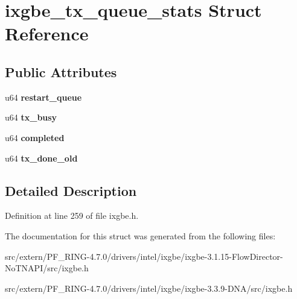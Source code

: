 \hypertarget{structixgbe__tx__queue__stats}{
\section{ixgbe\_\-tx\_\-queue\_\-stats Struct Reference}
\label{structixgbe__tx__queue__stats}
}
\subsection*{Public Attributes}
\begin{DoxyCompactItemize}
\item 
\hypertarget{structixgbe__tx__queue__stats_a6b5b4dfe2dcf07fc28d8f4a99413fb33}{
u64 {\bfseries restart\_\-queue}}
\label{structixgbe__tx__queue__stats_a6b5b4dfe2dcf07fc28d8f4a99413fb33}

\item 
\hypertarget{structixgbe__tx__queue__stats_aeb684ad4734bb1cc1ec413e96d2f5338}{
u64 {\bfseries tx\_\-busy}}
\label{structixgbe__tx__queue__stats_aeb684ad4734bb1cc1ec413e96d2f5338}

\item 
\hypertarget{structixgbe__tx__queue__stats_a27a76b4224e22091c3f88fc24785cecd}{
u64 {\bfseries completed}}
\label{structixgbe__tx__queue__stats_a27a76b4224e22091c3f88fc24785cecd}

\item 
\hypertarget{structixgbe__tx__queue__stats_a6d4f89d5c17a8716e3b6df373ea4b77e}{
u64 {\bfseries tx\_\-done\_\-old}}
\label{structixgbe__tx__queue__stats_a6d4f89d5c17a8716e3b6df373ea4b77e}

\end{DoxyCompactItemize}


\subsection{Detailed Description}


Definition at line 259 of file ixgbe.h.



The documentation for this struct was generated from the following files:\begin{DoxyCompactItemize}
\item 
src/extern/PF\_\-RING-\/4.7.0/drivers/intel/ixgbe/ixgbe-\/3.1.15-\/FlowDirector-\/NoTNAPI/src/ixgbe.h\item 
src/extern/PF\_\-RING-\/4.7.0/drivers/intel/ixgbe/ixgbe-\/3.3.9-\/DNA/src/ixgbe.h\end{DoxyCompactItemize}
